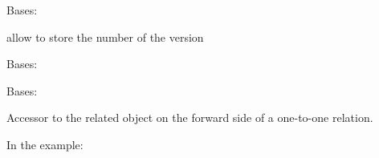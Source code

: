 \documentclass[letterpaper,10pt,english]{sphinxmanual}
\begin{document}
\begin{fulllineitems}
\label{\detokenize{QuChemPedIA.models:QuChemPedIA.models.VersionModel.SoftwareVersion}}
Bases: 

allow to store the number of the version

\begin{fulllineitems}
\label{\detokenize{QuChemPedIA.models:QuChemPedIA.models.VersionModel.SoftwareVersion.DoesNotExist}}
Bases: 

\end{fulllineitems}


\begin{fulllineitems}
\label{\detokenize{QuChemPedIA.models:QuChemPedIA.models.VersionModel.SoftwareVersion.MultipleObjectsReturned}}
Bases: 

\end{fulllineitems}


\begin{fulllineitems}
\label{\detokenize{QuChemPedIA.models:QuChemPedIA.models.VersionModel.SoftwareVersion.id_software}}
Accessor to the related object on the forward side of a one-to-one relation.

In the example:

%
\begin{sphinxVerbatim}[commandchars=\\\{\}]
 
       
\end{sphinxVerbatim}


\end{fulllineitems}
\end{fulllineitems}
\end{document}
